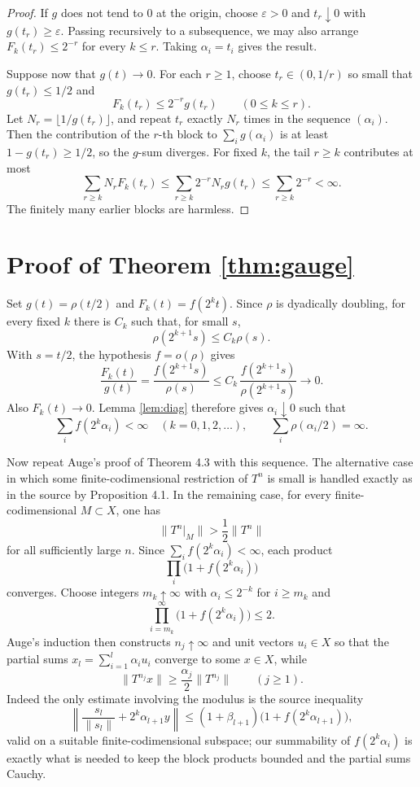 \documentclass[11pt]{article}
\begin{document}
\begin{proof}
If \(g\) does not tend to \(0\) at the origin, choose \(\varepsilon>0\) and
\(t_r\downarrow0\) with \(g(t_r)\ge\varepsilon\).  Passing recursively to a
subsequence, we may also arrange \(F_k(t_r)\le2^{-r}\) for every \(k\le r\).
Taking \(\alpha_i=t_i\) gives the result.

Suppose now that \(g(t)\to0\).  For each \(r\ge1\), choose \(t_r\in(0,1/r)\)
so small that \(g(t_r)\le1/2\) and
\[
  F_k(t_r)\le 2^{-r}g(t_r) \qquad (0\le k\le r).
\]
Let \(N_r=\lfloor 1/g(t_r)\rfloor\), and repeat \(t_r\) exactly \(N_r\)
times in the sequence \((\alpha_i)\).  Then the contribution of the \(r\)-th
block to \(\sum_i g(\alpha_i)\) is at least \(1-g(t_r)\ge1/2\), so the
\(g\)-sum diverges.  For fixed \(k\), the tail \(r\ge k\) contributes at most
\[
  \sum_{r\ge k} N_r F_k(t_r)
  \le \sum_{r\ge k} 2^{-r} N_r g(t_r)
  \le \sum_{r\ge k} 2^{-r}<\infty .
\]
The finitely many earlier blocks are harmless.
\end{proof}

\section*{Proof of Theorem \ref{thm:gauge}}

Set \(g(t)=\rho(t/2)\) and \(F_k(t)=f(2^k t)\).  Since \(\rho\) is
dyadically doubling, for every fixed \(k\) there is \(C_k\) such that, for
small \(s\),
\[
  \rho(2^{k+1}s)\le C_k\rho(s).
\]
With \(s=t/2\), the hypothesis \(f=o(\rho)\) gives
\[
  \frac{F_k(t)}{g(t)}
  =
  \frac{f(2^{k+1}s)}{\rho(s)}
  \le
  C_k\,\frac{f(2^{k+1}s)}{\rho(2^{k+1}s)}
  \longrightarrow0.
\]
Also \(F_k(t)\to0\).  Lemma \ref{lem:diag} therefore gives
\(\alpha_i\downarrow0\) such that
\[
  \sum_i f(2^k\alpha_i)<\infty \quad (k=0,1,2,\ldots),
  \qquad
  \sum_i \rho(\alpha_i/2)=\infty .
\]

Now repeat Auge's proof of Theorem 4.3 with this sequence.  The alternative
case in which some finite-codimensional restriction of \(T^n\) is small is
handled exactly as in the source by Proposition 4.1.  In the remaining case,
for every finite-codimensional \(M\subset X\), one has
\[
  \|T^n|_M\|>\frac12\|T^n\|
\]
for all sufficiently large \(n\).  Since
\(\sum_i f(2^k\alpha_i)<\infty\), each product
\[
  \prod_i \bigl(1+f(2^k\alpha_i)\bigr)
\]
converges.  Choose integers \(m_k\uparrow\infty\) with
\(\alpha_i\le2^{-k}\) for \(i\ge m_k\) and
\[
  \prod_{i=m_k}^{\infty}\bigl(1+f(2^k\alpha_i)\bigr)\le2 .
\]
Auge's induction then constructs \(n_j\uparrow\infty\) and unit vectors
\(u_i\in X\) so that the partial sums \(x_l=\sum_{i=1}^l\alpha_i u_i\)
converge to some \(x\in X\), while
\[
  \|T^{n_j}x\|\ge \frac{\alpha_j}{2}\|T^{n_j}\|
  \qquad (j\ge1).
\]
Indeed the only estimate involving the modulus is the source inequality
\[
  \left\|\frac{s_l}{\|s_l\|}+2^k\alpha_{l+1}y\right\|
  \le (1+\beta_{l+1})\bigl(1+f(2^k\alpha_{l+1})\bigr),
\]
valid on a suitable finite-codimensional subspace; our summability of
\(f(2^k\alpha_i)\) is exactly what is needed to keep the block products
bounded and the partial sums Cauchy.
\end{document}
